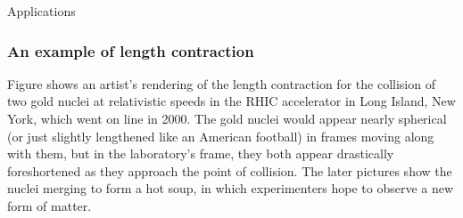 \begin{envsubsection}{Applications}
\subsubsection{An example of length contraction}
Figure  shows an
artist's rendering of the length contraction for the collision of two
gold nuclei at relativistic speeds in the RHIC accelerator
in Long Island, New York, which went on line in 2000.
The gold nuclei would appear nearly spherical (or just
slightly lengthened like an American football) in frames
moving along with them, but in the laboratory's frame, they
both appear drastically foreshortened as they approach the
point of collision. The later pictures show the nuclei
merging to form a hot soup, in which experimenters hope to
observe a new form of matter.
\end{envsubsection}

\pagebreak[4]


